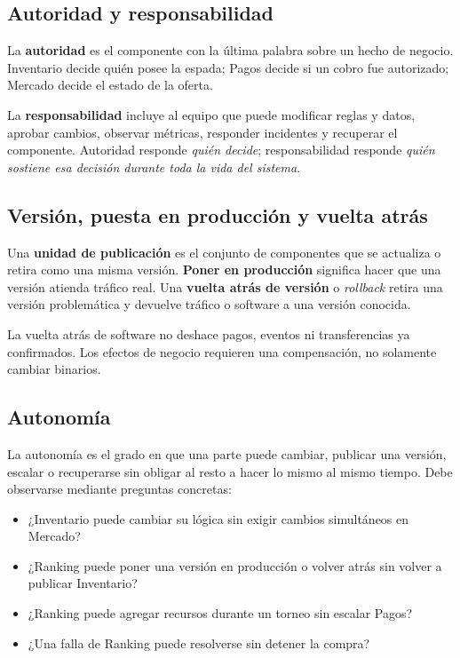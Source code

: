 \documentclass[variant=apuntes,cover=institutional,mode=screen]{ua-engineering-v6-article}
\begin{document}
\subsection{Autoridad y responsabilidad}

La \textbf{autoridad} es el componente con la última palabra sobre un hecho de negocio. Inventario decide quién posee la espada; Pagos decide si un cobro fue autorizado; Mercado decide el estado de la oferta.

La \textbf{responsabilidad} incluye al equipo que puede modificar reglas y datos, aprobar cambios, observar métricas, responder incidentes y recuperar el componente. Autoridad responde \emph{quién decide}; responsabilidad responde \emph{quién sostiene esa decisión durante toda la vida del sistema}.

\subsection{Versión, puesta en producción y vuelta atrás}

Una \textbf{unidad de publicación} es el conjunto de componentes que se actualiza o retira como una misma versión. \textbf{Poner en producción} significa hacer que una versión atienda tráfico real. Una \textbf{vuelta atrás de versión} o \emph{rollback} retira una versión problemática y devuelve tráfico o software a una versión conocida.

La vuelta atrás de software no deshace pagos, eventos ni transferencias ya confirmados. Los efectos de negocio requieren una compensación, no solamente cambiar binarios.

\subsection{Autonomía}

La autonomía es el grado en que una parte puede cambiar, publicar una versión, escalar o recuperarse sin obligar al resto a hacer lo mismo al mismo tiempo. Debe observarse mediante preguntas concretas:

\begin{itemize}
\item ¿Inventario puede cambiar su lógica sin exigir cambios simultáneos en Mercado?
\item ¿Ranking puede poner una versión en producción o volver atrás sin volver a publicar Inventario?
\item ¿Ranking puede agregar recursos durante un torneo sin escalar Pagos?
\item ¿Una falla de Ranking puede resolverse sin detener la compra?
\end{itemize}
\end{document}
